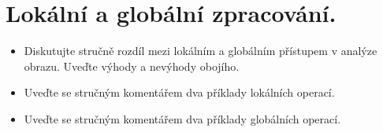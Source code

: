 \section{Lokální a globální zpracování.}
\begin{itemize}
    \item Diskutujte stručně rozdíl mezi lokálním a globálním přístupem v analýze obrazu. Uveďte výhody a nevýhody 
    obojího.
    \item Uveďte se stručným komentářem dva příklady lokálních operací.
    \item Uveďte se stručným komentářem dva příklady globálních operací.
\end{itemize}